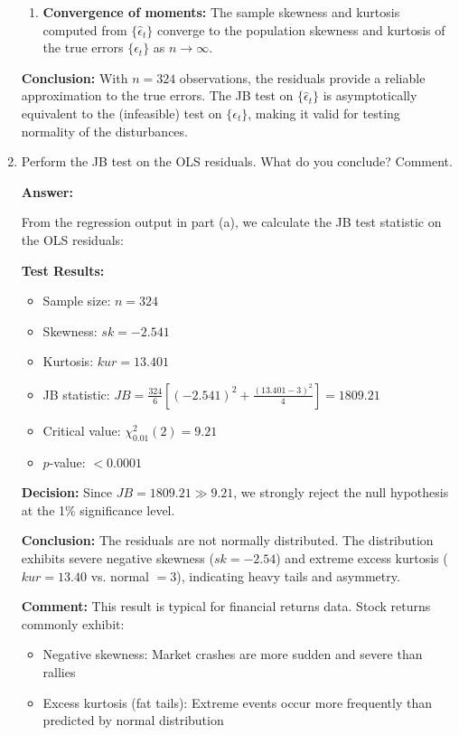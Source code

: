 \documentclass[12pt,a4paper]{article}
\begin{document}
\begin{enumerate}[label=(\alph*)]
\begin{enumerate}
\item \textbf{Convergence of moments:} The sample skewness and kurtosis computed from $\{\hat{\epsilon}_t\}$ converge to the population skewness and kurtosis of the true errors $\{\epsilon_t\}$ as $n \to \infty$.
\end{enumerate}

\textbf{Conclusion:} With $n = 324$ observations, the residuals provide a reliable approximation to the true errors. The JB test on $\{\hat{\epsilon}_t\}$ is asymptotically equivalent to the (infeasible) test on $\{\epsilon_t\}$, making it valid for testing normality of the disturbances.
  
  \item Perform the JB test on the OLS residuals. What do you conclude? Comment.

  \textbf{Answer:}

From the regression output in part (a), we calculate the JB test statistic on the OLS residuals:

\textbf{Test Results:}
\begin{itemize}
\item Sample size: $n = 324$
\item Skewness: $sk = -2.541$
\item Kurtosis: $kur = 13.401$
\item JB statistic: $JB = \frac{324}{6}\left[(-2.541)^2 + \frac{(13.401-3)^2}{4}\right] = 1809.21$
\item Critical value: $\chi^2_{0.01}(2) = 9.21$
\item $p$-value: $< 0.0001$
\end{itemize}

\textbf{Decision:} Since $JB = 1809.21 \gg 9.21$, we strongly reject the null hypothesis at the 1\% significance level.

\textbf{Conclusion:} The residuals are not normally distributed. The distribution exhibits severe negative skewness ($sk = -2.54$) and extreme excess kurtosis ($kur = 13.40$ vs. normal $= 3$), indicating heavy tails and asymmetry.

\textbf{Comment:} This result is typical for financial returns data. Stock returns commonly exhibit:
\begin{itemize}
\item Negative skewness: Market crashes are more sudden and severe than rallies
\item Excess kurtosis (fat tails): Extreme events occur more frequently than predicted by normal distribution
\end{itemize}


\end{enumerate}
\end{document}
